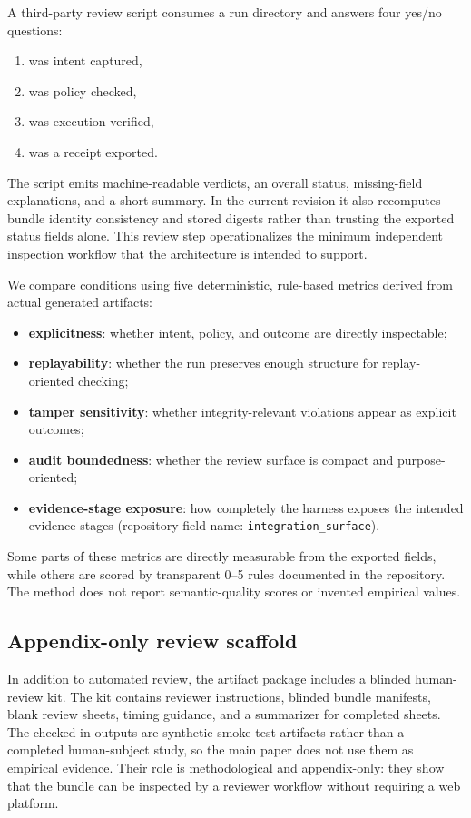 A third-party review script consumes a run directory and answers four yes/no questions:

\begin{enumerate}[leftmargin=1.8em]
  \item was intent captured,
  \item was policy checked,
  \item was execution verified,
  \item was a receipt exported.
\end{enumerate}

The script emits machine-readable verdicts, an overall status, missing-field explanations, and a short summary. In the current revision it also recomputes bundle identity consistency and stored digests rather than trusting the exported status fields alone. This review step operationalizes the minimum independent inspection workflow that the architecture is intended to support.

We compare conditions using five deterministic, rule-based metrics derived from actual generated artifacts:

\begin{itemize}
  \item \textbf{explicitness}: whether intent, policy, and outcome are directly inspectable;
  \item \textbf{replayability}: whether the run preserves enough structure for replay-oriented checking;
  \item \textbf{tamper sensitivity}: whether integrity-relevant violations appear as explicit outcomes;
  \item \textbf{audit boundedness}: whether the review surface is compact and purpose-oriented;
  \item \textbf{evidence-stage exposure}: how completely the harness exposes the intended evidence stages (repository field name: \texttt{integration\_surface}).
\end{itemize}

Some parts of these metrics are directly measurable from the exported fields, while others are scored by transparent 0--5 rules documented in the repository. The method does not report semantic-quality scores or invented empirical values.

\subsection{Appendix-only review scaffold}

In addition to automated review, the artifact package includes a blinded human-review kit. The kit contains reviewer instructions, blinded bundle manifests, blank review sheets, timing guidance, and a summarizer for completed sheets. The checked-in outputs are synthetic smoke-test artifacts rather than a completed human-subject study, so the main paper does not use them as empirical evidence. Their role is methodological and appendix-only: they show that the bundle can be inspected by a reviewer workflow without requiring a web platform.
